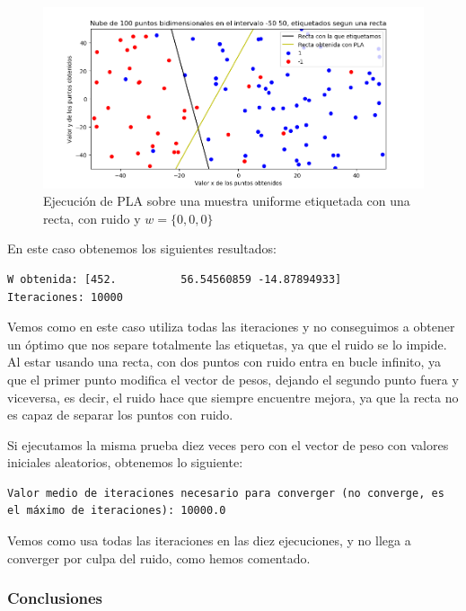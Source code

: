 \documentclass[12pt, spanish]{article}
\begin{document}
\begin{figure}[H]
  \centering
      \includegraphics[scale = 0.70]{ej-2-PLA-ruido.png}
 		 \caption{Ejecución de PLA sobre una muestra uniforme etiquetada con una recta, con ruido y $w = \{0, 0, 0\}$}
  		\label{fig:ej2-PLA}

\end{figure}

En este caso obtenemos los siguientes resultados:

\begin{lstlisting}
W obtenida: [452.          56.54560859 -14.87894933]
Iteraciones: 10000
\end{lstlisting}

Vemos como en este caso utiliza todas las iteraciones y no conseguimos a obtener un óptimo que nos separe totalmente las etiquetas, ya que el ruido se lo impide. Al estar usando una recta, con dos puntos con ruido entra en bucle infinito, ya que el primer punto modifica el vector de pesos, dejando el segundo punto fuera y viceversa, es decir, el ruido hace que siempre encuentre mejora, ya que la recta no es capaz de separar los puntos con ruido.


Si ejecutamos la misma prueba diez veces pero con el vector de peso con valores iniciales aleatorios, obtenemos lo siguiente:

\begin{lstlisting}
Valor medio de iteraciones necesario para converger (no converge, es el máximo de iteraciones): 10000.0
\end{lstlisting}

Vemos como usa todas las iteraciones en las diez ejecuciones, y no llega a converger por culpa del ruido, como hemos comentado.


\subsubsection{Conclusiones}
\end{document}
